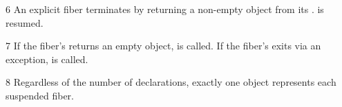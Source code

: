 6 An explicit fiber terminates by returning a non-empty \fiber object from
its \entryfn.  is resumed.



7 If the fiber's \entryfn returns an empty \fiber object,  is called.
If the fiber's \entryfn exits via an exception,  is called.

8 Regardless of the number of \fiber declarations, exactly one \fiber object
represents each suspended fiber.



